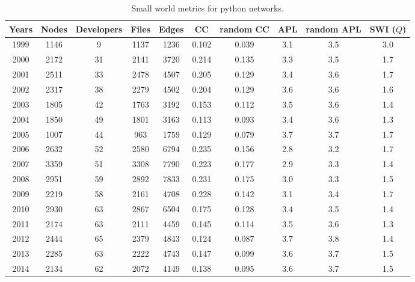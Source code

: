 \begin{table}
\begin{center}
\begin{tabular}{|c|c|c|c|c|c|c|c|c|c|}
\hline
Years&Nodes&Developers&Files&Edges&CC&random CC&APL&random APL&SWI ($Q$)\\
\hline
1999&1146&9&1137&1236&0.102&0.039&3.1&3.5&3.0\\
2000&2172&31&2141&3720&0.214&0.135&3.3&3.5&1.7\\
2001&2511&33&2478&4507&0.205&0.129&3.4&3.6&1.7\\
2002&2317&38&2279&4502&0.204&0.129&3.6&3.6&1.6\\
2003&1805&42&1763&3192&0.153&0.112&3.5&3.6&1.4\\
2004&1850&49&1801&3163&0.113&0.093&3.4&3.6&1.3\\
2005&1007&44&963&1759&0.129&0.079&3.7&3.7&1.7\\
2006&2632&52&2580&6794&0.235&0.156&2.8&3.2&1.7\\
2007&3359&51&3308&7790&0.223&0.177&2.9&3.3&1.4\\
2008&2951&59&2892&7833&0.231&0.175&3.0&3.3&1.5\\
2009&2219&58&2161&4708&0.228&0.142&3.1&3.4&1.7\\
2010&2930&63&2867&6504&0.175&0.128&3.4&3.5&1.4\\
2011&2174&63&2111&4459&0.145&0.114&3.5&3.6&1.3\\
2012&2444&65&2379&4843&0.124&0.087&3.7&3.8&1.4\\
2013&2285&63&2222&4743&0.147&0.099&3.6&3.7&1.5\\
2014&2134&62&2072&4149&0.138&0.095&3.6&3.7&1.5\\
\hline
\end{tabular}
\caption{Small world metrics for python networks.}
\label{swi_python}
\end{center}
\end{table}

